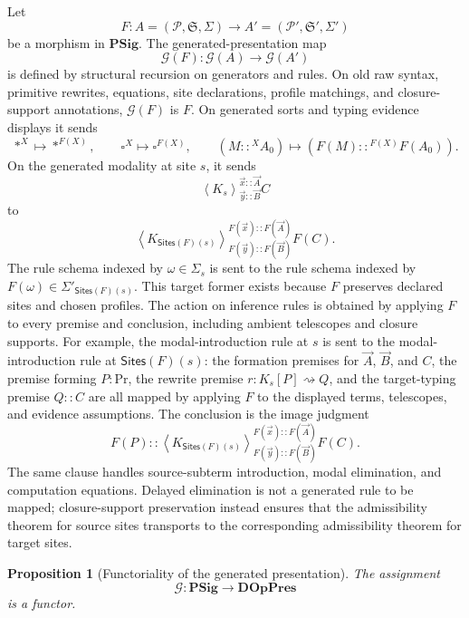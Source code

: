 \documentclass[11pt]{article}
\newcommand{\Proc}{\mathrm{Pr}}
\newcommand{\rw}{\rightsquigarrow}
\newcommand{\ty}{\mathrel{::}}
\newcommand{\Sites}{\mathsf{Sites}}
\newcommand{\Sig}{\Sigma}
\newcommand{\Mod}[4]{\left\langle #1\right\rangle^{#2}_{#3} #4}
\newtheorem{proposition}[definition]{Proposition}
\begin{document}
Let
\[
  F:A=(\mathcal{P},\mathfrak{S},\Sig)
  \longrightarrow
  A'=(\mathcal{P}',\mathfrak{S}',\Sig')
\]
be a morphism in \(\mathbf{PSig}\).  The generated-presentation map
\[
  \mathcal{G}(F):\mathcal{G}(A)\longrightarrow\mathcal{G}(A')
\]
is defined by structural recursion on generators and rules.  On old raw syntax,
primitive rewrites, equations, site declarations, profile matchings, and
closure-support annotations, \(\mathcal{G}(F)\) is \(F\).  On generated sorts
and typing evidence displays it sends
\[
  \ast^X\mapsto\ast^{F(X)},
  \qquad
  \square^X\mapsto\square^{F(X)},
  \qquad
  (M\ty^X A_0)\mapsto(F(M)\ty^{F(X)}F(A_0)).
\]
On the generated modality at site \(s\), it sends
\[
  \Mod{K_s}{\vec{x}\ty\vec{A}}{\vec{y}\ty\vec{B}}{C}
\]
to
\[
  \Mod{K_{\Sites(F)(s)}}{F(\vec{x})\ty F(\vec{A})}
       {F(\vec{y})\ty F(\vec{B})}{F(C)}.
\]
The rule schema indexed by \(\omega\in\Sig_s\) is sent to the rule schema
indexed by \(F(\omega)\in\Sig'_{\Sites(F)(s)}\).
This target former exists because \(F\) preserves declared sites and chosen
profiles.  The action on inference rules is obtained by applying \(F\) to every
premise and conclusion, including ambient telescopes and closure supports.  For example, the modal-introduction rule at \(s\) is sent to the
modal-introduction rule at \(\Sites(F)(s)\): the formation premises for
\(\vec A\), \(\vec B\), and \(C\), the premise forming \(P:\Proc\), the rewrite
premise \(r:K_s[P]\rw Q\), and the target-typing premise \(Q\ty C\) are all
mapped by applying \(F\) to the displayed terms, telescopes, and evidence
assumptions.  The conclusion is the image judgment
\[
  F(P)\ty
  \Mod{K_{\Sites(F)(s)}}{F(\vec{x})\ty F(\vec{A})}
       {F(\vec{y})\ty F(\vec{B})}{F(C)}.
\]
The same clause handles source-subterm introduction, modal elimination, and
computation equations.  Delayed elimination is not a generated rule to be mapped;
closure-support preservation instead ensures that the admissibility theorem for
source sites transports to the corresponding admissibility theorem for target sites.

\begin{proposition}[Functoriality of the generated presentation]
The assignment
\[
  \mathcal{G}:\mathbf{PSig}\longrightarrow\mathbf{DOpPres}
\]
is a functor.
\end{proposition}
\end{document}
